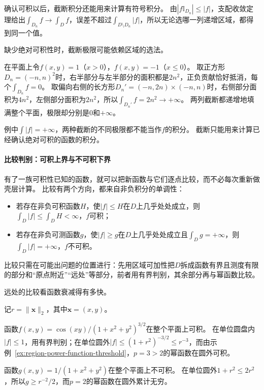 确认可积以后，截断积分还能用来计算有符号积分。
由$|f\mathbb I_{D_n}|\leq|f|$，支配收敛定理给出$\int_{D_n}f\to\int_Df$，误差不超过$\int_{D\setminus D_n}|f|$，所以无论选哪一列递增区域，都得到同一个值。

缺少绝对可积性时，截断极限可能依赖区域的选法。
\begin{example}[截断极限依赖截断方式]
\label{ex:region-truncation-dependence}
在平面上令$f(x,y)=1$（$x>0$），$f(x,y)=-1$（$x\leq0$）。
取正方形$D_n=(-n,n)^2$时，右半部分与左半部分的面积都是$2n^2$，正负贡献恰好抵消，每个$\int_{D_n}f=0$。
取偏向右侧的长方形$D_n'=(-n,2n)\times(-n,n)$时，右侧部分面积为$4n^2$，左侧部分面积为$2n^2$，所以$\int_{D_n'}f=2n^2\to+\infty$。
两列截断都递增地填满整个平面，极限却分别是$0$和$+\infty$。
\end{example}

例中$\int|f|=+\infty$，两种截断的不同极限都不能当作$f$的积分。
截断只能用来计算已经确认绝对可积的函数的积分。

\paragraph{比较判别：可积上界与不可积下界}

有了一族可积性已知的函数，就可以把新函数与它们逐点比较，而不必每次重新做壳层计算。
比较有两个方向，都来自非负积分的单调性：
\begin{itemize}
 \item 若存在非负可积函数$H$，使$|f|\leq H$在$D$上几乎处处成立，则$\int_D|f|\leq\int_DH<\infty$，$f$可积；
 \item 若存在非负可测函数$g$，使$|f|\geq g$在$D$上几乎处处成立且$\int_Dg=+\infty$，则$\int_D|f|=+\infty$，$f$不可积。
\end{itemize}
比较只需在可能出问题的位置进行：先用区域可加性把$D$拆成函数有界且测度有限的部分和“原点附近”“远处”等部分，前者用有界判别，其余部分再与幂函数比较。

远处的比较看函数衰减得有多快。
\begin{example}[远处与$r^{-3}$和$r^{-2}$比较]
\label{ex:region-comparison-at-infinity}
记$r=\lVert\bm x\rVert_2$，其中$\bm x=(x,y)$。

函数$f(x,y)=\cos(xy)/(1+x^2+y^2)^{3/2}$在整个平面上可积。
在单位圆盘内$|f|\leq1$，用有界判别；在单位圆外$|f|\leq(1+r^2)^{-3/2}\leq r^{-3}$，而由示例~\ref{ex:region-power-function-threshold}，$p=3>2$的幂函数在圆外可积。

函数$g(x,y)=1/(1+x^2+y^2)$在整个平面上不可积。
在单位圆外$1+r^2\leq2r^2$，所以$g\geq r^{-2}/2$，而$p=2$的幂函数在圆外累计无穷。
\end{example}

